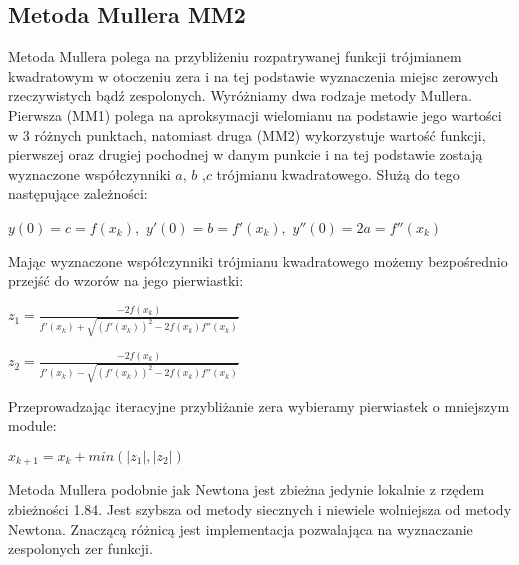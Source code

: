 \documentclass[a4paper, 11pt]{article}
\begin{document}
\subsection{Metoda Mullera MM2}
Metoda Mullera polega na przybliżeniu rozpatrywanej funkcji trójmianem kwadratowym w otoczeniu zera i na tej podstawie wyznaczenia miejsc zerowych rzeczywistych bądź zespolonych. Wyróżniamy dwa rodzaje metody Mullera. Pierwsza (MM1) polega na aproksymacji wielomianu na podstawie jego wartości w 3 różnych punktach, natomiast druga (MM2) wykorzystuje wartość funkcji, pierwszej oraz drugiej pochodnej w danym punkcie i na tej podstawie zostają wyznaczone współczynniki $a$, $b$ ,$c$ trójmianu kwadratowego. Służą do tego następujące zależności:
\begin{center}
$y(0) = c = f(x_{k}),$
$y'(0) = b = f'(x_{k}),$
$y''(0) = 2a = f''(x_{k})$
\end{center}
Mając wyznaczone współczynniki trójmianu kwadratowego możemy bezpośrednio przejść do wzorów na jego pierwiastki:
\begin{center}
$z_{1} = \frac{-2f(x_{k})}{f'(x_{k})+\sqrt{(f'(x_{k}))^2-2f(x_{k})f''(x_{k})}}$
\end{center}
\begin{center}
$z_{2} = \frac{-2f(x_{k})}{f'(x_{k})-\sqrt{(f'(x_{k}))^2-2f(x_{k})f''(x_{k})}}$
\end{center}
Przeprowadzając iteracyjne przybliżanie zera wybieramy pierwiastek o mniejszym module:
\begin{center}
$x_{k+1} = x_{k}+min(|z_{1}|,|z_{2}|)$
\end{center}
Metoda Mullera podobnie jak Newtona jest zbieżna jedynie lokalnie z rzędem zbieżności 1.84. Jest szybsza od metody siecznych i niewiele wolniejsza od metody Newtona. Znaczącą różnicą jest implementacja pozwalająca na wyznaczanie zespolonych zer funkcji. 
\end{document}
